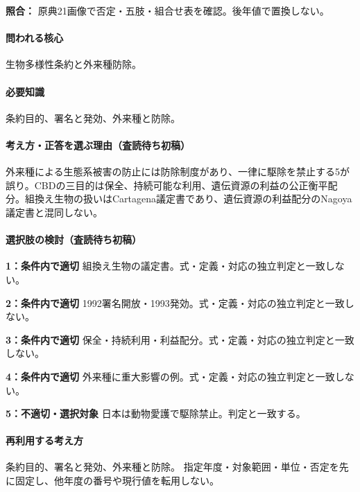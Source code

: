 \noindent\textbf{照合：} 原典21画像で否定・五肢・組合せ表を確認。後年値で置換しない。\par

\paragraph{問われる核心} 生物多様性条約と外来種防除。

\paragraph{必要知識} 条約目的、署名と発効、外来種と防除。

\paragraph{考え方・正答を選ぶ理由（査読待ち初稿）} 外来種による生態系被害の防止には防除制度があり、一律に駆除を禁止する5が誤り。CBDの三目的は保全、持続可能な利用、遺伝資源の利益の公正衡平配分。組換え生物の扱いはCartagena議定書であり、遺伝資源の利益配分のNagoya議定書と混同しない。

\paragraph{選択肢の検討（査読待ち初稿）}\mbox{}\par

\noindent\textbf{1：条件内で適切} 組換え生物の議定書。式・定義・対応の独立判定と一致しない。\par

\noindent\textbf{2：条件内で適切} 1992署名開放・1993発効。式・定義・対応の独立判定と一致しない。\par

\noindent\textbf{3：条件内で適切} 保全・持続利用・利益配分。式・定義・対応の独立判定と一致しない。\par

\noindent\textbf{4：条件内で適切} 外来種に重大影響の例。式・定義・対応の独立判定と一致しない。\par

\noindent\textbf{5：不適切・選択対象} 日本は動物愛護で駆除禁止。判定と一致する。\par

\paragraph{再利用する考え方} 条約目的、署名と発効、外来種と防除。 指定年度・対象範囲・単位・否定を先に固定し、他年度の番号や現行値を転用しない。

